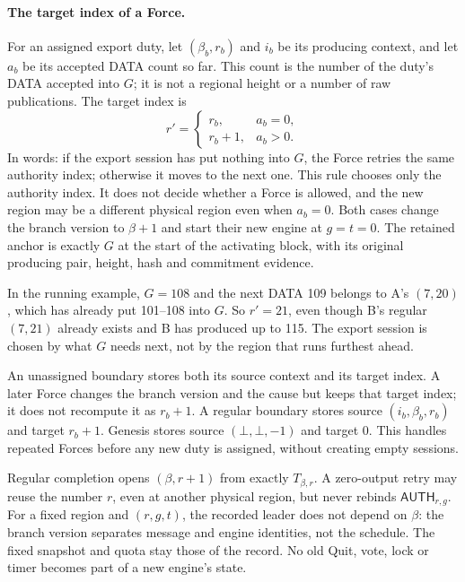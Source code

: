 \documentclass[11pt,a4paper]{article}
\newcommand{\tagg}[1]{\ensuremath{\mathsf{#1}}}
\begin{document}
\paragraph{The target index of a Force.}
\label{sec:retry-slot}
For an assigned export duty, let $(\beta_b,r_b)$ and $i_b$ be its
producing context, and let $a_b$ be its accepted DATA count so far. This
count is the number of the duty's DATA accepted into $G$; it is not a
regional height or a number of raw publications. The target index is
\[
 r'=
 \begin{cases}
 r_b,&a_b=0,\\
 r_b+1,&a_b>0.
 \end{cases}
\]
In words: if the export session has put nothing into $G$, the Force
retries the same authority index; otherwise it moves to the next one.
This rule chooses only the authority index. It does not decide whether a
Force is allowed, and the new region may be a different physical region
even when $a_b=0$. Both cases change the branch version to $\beta+1$ and
start their new engine at $g=t=0$. The retained anchor is exactly $G$ at
the start of the activating block, with its original producing pair,
height, hash and commitment evidence.

In the running example, $G=108$ and the next DATA 109 belongs to A's
$(7,20)$, which has already put 101--108 into $G$. So $r'=21$, even though
B's regular $(7,21)$ already exists and B has produced up to 115. The
export session is chosen by what $G$ needs next, not by the region that
runs furthest ahead.

An unassigned boundary stores both its source context and its target
index. A later Force changes the branch version and the cause but keeps
that target index; it does not recompute it as $r_b+1$. A regular
boundary stores source $(i_b,\beta_b,r_b)$ and target $r_b+1$. Genesis
stores source $(\bot,\bot,-1)$ and target 0. This handles repeated Forces
before any new duty is assigned, without creating empty sessions.

Regular completion opens $(\beta,r+1)$ from exactly $T_{\beta,r}$. A
zero-output retry may reuse the number $r$, even at another physical
region, but never rebinds $\tagg{AUTH}_{r,g}$. For a fixed region and
$(r,g,t)$, the recorded leader does not depend on $\beta$: the branch
version separates message and engine identities, not the schedule. The
fixed snapshot and quota stay those of the record. No old Quit, vote,
lock or timer becomes part of a new engine's state.
\end{document}
